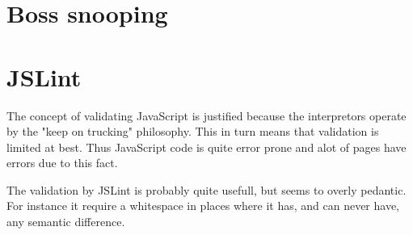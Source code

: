 \documentclass[a4paper,10pt]{article}
\begin{document}
\section*{Boss snooping}


\section*{JSLint}
The concept of validating JavaScript is justified because the interpretors operate by the "keep on trucking" philosophy. This in turn means that validation is limited at best. Thus JavaScript code is quite error prone and alot of pages have errors due to this fact.

The validation by JSLint is probably quite usefull, but seems to overly pedantic. For instance it require a whitespace in places where it has, and can never have, any semantic difference. 
\end{document}
